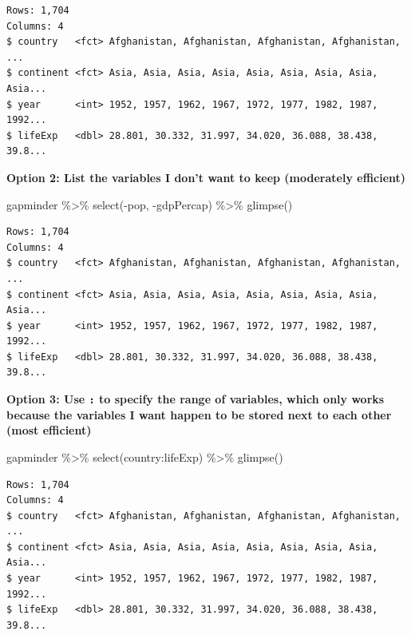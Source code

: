 \documentclass[
]{book}
\makeatletter
\newenvironment{Shaded}{\begin{snugshade}}{\end{snugshade}}
\newcommand{\FunctionTok}[1]{\textcolor[rgb]{0,0,0}{#1}}
\newcommand{\NormalTok}[1]{#1}
\newcommand{\SpecialCharTok}[1]{\textcolor[rgb]{0,0,0}{#1}}
\newenvironment{kframe}{%
\medskip{}
\setlength{\fboxsep}{.8em}
 \def\at@end@of@kframe{}%
 \ifinner\ifhmode%
  \def\at@end@of@kframe{\end{minipage}}%
  \begin{minipage}{\columnwidth}%
 \fi\fi%
 \def\FrameCommand##1{\hskip\@totalleftmargin \hskip-\fboxsep
 \colorbox{shadecolor}{##1}\hskip-\fboxsep
     \hskip-\linewidth \hskip-\@totalleftmargin \hskip\columnwidth}%
 \MakeFramed {\advance\hsize-\width
   \@totalleftmargin\z@ \linewidth\hsize
   \@setminipage}}%
 {\par\unskip\endMakeFramed%
 \at@end@of@kframe}
\renewenvironment{Shaded}{\begin{kframe}}{\end{kframe}}
\makeatother
\begin{document}
\begin{verbatim}
Rows: 1,704
Columns: 4
$ country   <fct> Afghanistan, Afghanistan, Afghanistan, Afghanistan, ...
$ continent <fct> Asia, Asia, Asia, Asia, Asia, Asia, Asia, Asia, Asia...
$ year      <int> 1952, 1957, 1962, 1967, 1972, 1977, 1982, 1987, 1992...
$ lifeExp   <dbl> 28.801, 30.332, 31.997, 34.020, 36.088, 38.438, 39.8...
\end{verbatim}

\textbf{Option 2: List the variables I don't want to keep (moderately efficient)}

\begin{Shaded}
\begin{Highlighting}[]
\NormalTok{gapminder }\SpecialCharTok{\%\textgreater{}\%} 
  \FunctionTok{select}\NormalTok{(}\SpecialCharTok{{-}}\NormalTok{pop, }\SpecialCharTok{{-}}\NormalTok{gdpPercap) }\SpecialCharTok{\%\textgreater{}\%} 
  \FunctionTok{glimpse}\NormalTok{()}
\end{Highlighting}
\end{Shaded}

\begin{verbatim}
Rows: 1,704
Columns: 4
$ country   <fct> Afghanistan, Afghanistan, Afghanistan, Afghanistan, ...
$ continent <fct> Asia, Asia, Asia, Asia, Asia, Asia, Asia, Asia, Asia...
$ year      <int> 1952, 1957, 1962, 1967, 1972, 1977, 1982, 1987, 1992...
$ lifeExp   <dbl> 28.801, 30.332, 31.997, 34.020, 36.088, 38.438, 39.8...
\end{verbatim}

\textbf{Option 3: Use \texttt{:} to specify the range of variables, which only works because the variables I want happen to be stored next to each other (most efficient)}

\begin{Shaded}
\begin{Highlighting}[]
\NormalTok{gapminder }\SpecialCharTok{\%\textgreater{}\%} 
  \FunctionTok{select}\NormalTok{(country}\SpecialCharTok{:}\NormalTok{lifeExp) }\SpecialCharTok{\%\textgreater{}\%} 
  \FunctionTok{glimpse}\NormalTok{()}
\end{Highlighting}
\end{Shaded}

\begin{verbatim}
Rows: 1,704
Columns: 4
$ country   <fct> Afghanistan, Afghanistan, Afghanistan, Afghanistan, ...
$ continent <fct> Asia, Asia, Asia, Asia, Asia, Asia, Asia, Asia, Asia...
$ year      <int> 1952, 1957, 1962, 1967, 1972, 1977, 1982, 1987, 1992...
$ lifeExp   <dbl> 28.801, 30.332, 31.997, 34.020, 36.088, 38.438, 39.8...
\end{verbatim}
\end{document}
